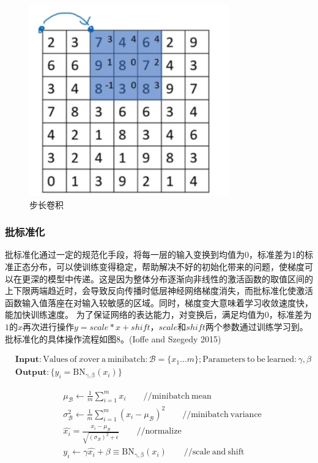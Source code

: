 \documentclass[hyperref, a4paper]{ctexart}
\begin{document}
\begin{figure}
\centering
\includegraphics{./7.png}
\caption{步长卷积}
\end{figure}

\hypertarget{ux6279ux6807ux51c6ux5316}{%
\subsubsection{批标准化}\label{ux6279ux6807ux51c6ux5316}}

批标准化通过一定的规范化手段，将每一层的输入变换到均值为0，标准差为1的标准正态分布，可以使训练变得稳定，帮助解决不好的初始化带来的问题，使梯度可以在更深的模型中传递。这是因为整体分布逐渐向非线性的激活函数的取值区间的上下限两端趋近时，会导致反向传播时低层神经网络梯度消失，而批标准化使激活函数输入值落座在对输入较敏感的区域。同时，梯度变大意味着学习收敛速度快，能加快训练速度。
为了保证网络的表达能力，对变换后，满足均值为\(0\)，标准差为\(1\)的\(x\)再次进行操作\(y=scale*x+shift\)，\(scale\)和\(shift\)两个参数通过训练学习到。
批标准化的具体操作流程如图8。(Ioffe and Szegedy 2015)

\[
\begin{aligned}&\mathbf{Input}:\mathrm{Values\ of\ } x \mathrm{over\ a\ minibatch:}\mathcal{B}=\{x_1…m\};\mathrm{Parameters\ to\ be\ learned:}\gamma,\beta \\&\mathbf{Output:}\{y_i=\mathrm{BN_{\gamma,\beta}}(x_i)\}\end{aligned}
\]

\[
\begin{aligned}
&\mu_\mathcal{B}\gets\frac{1}{m}\sum_{i = 1}^{m}x_i \qquad\mathrm{//minibatch\ mean} \\
&\sigma^2_\mathcal{B}\gets\frac{1}{m}\sum_{i = 1}^{m}(x_i-\mu_\mathcal{B})^2\qquad \mathrm{//minibatch\ variance} \\
&\hat{x_i} = \frac{x_i -\mu_\mathcal{B} }{\sqrt{(\sigma_\mathcal{B})^2 + \epsilon}} \qquad\mathrm{//normalize}\\
&y_i\gets\gamma\hat{x_i} + \beta\equiv\mathrm{BN_{\gamma,\beta}}(x_i)\qquad \mathrm{//scale\ and\ shift}
\end{aligned}
\]
\end{document}
